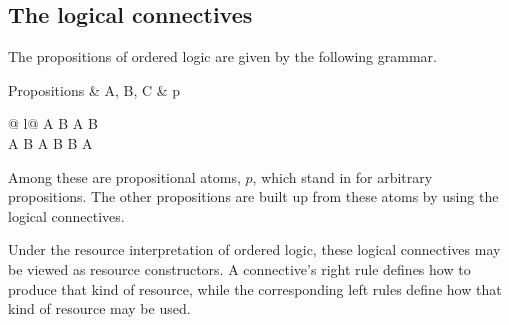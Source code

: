 
\subsection{The logical connectives}

The propositions of ordered logic are given by the following grammar.
\begin{syntax*}
  Propositions & A, B, C &
    p
    \begin{array}[t]{@{{} \mid {}}l@{}}
      A \fuse B \mid \one \mid A \plus B \mid \zero \\
      A \with B \mid \top \mid A \limp B \mid B \pmir A
    \end{array}
\end{syntax*}
Among these are propositional atoms, $p$, which stand in for arbitrary propositions.
The other propositions are built up from these atoms by using the logical connectives.

Under the resource interpretation of ordered logic, these logical connectives may be viewed as resource constructors.
A connective's right rule defines how to produce that kind of resource, while the corresponding left rules define how that kind of resource may be used.

